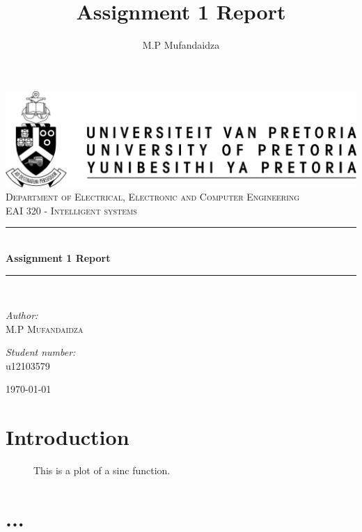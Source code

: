 \documentclass[a4paper,12pt]{report}
\author{M.P Mufandaidza}
\title{ Assignment 1 Report}
\newcommand{\HRule}{\rule{\linewidth}{0.5mm}}
\begin{document}
\setlength{\parskip}{6pt}
\begin{titlepage}

\begin{center}
\includegraphics[width=1\textwidth]{./up-logo.jpg}\\[0.4cm]    
\textsc{\LARGE Department of Electrical, Electronic and Computer Engineering}\\[1.5cm]
\textsc{\Large EAI 320 - Intelligent systems}\\[0.5cm]
\HRule \\[0.4cm]
{ \huge \bfseries Assignment 1 Report}\\[0.4cm]
\HRule \\[0.4cm]
\begin{minipage}{0.4\textwidth}
\begin{flushleft} \large
\emph{Author:}\\
M.P \textsc{Mufandaidza}
\end{flushleft}
\end{minipage}
\begin{minipage}{0.4\textwidth}
\begin{flushright} \large
\emph{Student number:} \\
u12103579
\end{flushright}
\end{minipage}
\vfill
{\large \today}
\end{center}
\end{titlepage}
\footnotesize

\normalsize
\setcounter{chapter}{1}
\renewcommand{\thesection}{\arabic{section}}

\section{Introduction}



\begin{figure}[h]
  \label{fig:SLAM}
  \caption{This is a plot of a sinc function.}
\end{figure}


\newpage
\section{...}


{} %

\end{document}
